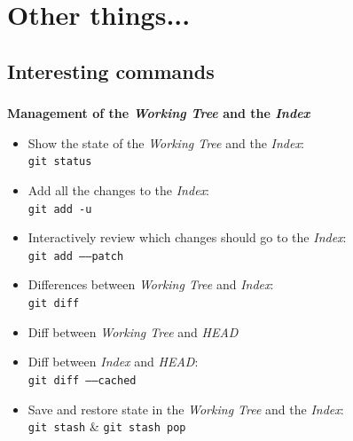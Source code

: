 
\section{Other things...}

\subsection{Interesting commands}

\begin{frame}
  \frametitle{\insertsubsection}

  \textbf{Management of the \textit{Working Tree} and the \textit{Index}}
  \begin{itemize}
  \item Show the state of the \textit{Working Tree} and the \textit{Index}:\\
    \texttt{git status}
    \vspacing

  \item Add all the changes to the \textit{Index}:\\
    \texttt{git add -u}
    \vspacing

  \item Interactively review which changes
    should go to the \textit{Index}:\\
    \texttt{git add \---\---patch} \vspacing

  \item Differences between \textit{Working Tree} and
    \textit{Index}:\\
    \texttt{git diff}
    \vspacing
  \item Diff between \textit{Working Tree} and \textit{HEAD} \vspacing
  \item Diff between \textit{Index} and \textit{HEAD}:\\
    \texttt{git diff \---\---cached}
    \vspacing

  \item Save and restore state in the \textit{Working Tree} and the
    \textit{Index}:\\
    \texttt{git stash} \& \texttt{git stash pop}
    \vspacing
  \end{itemize}
\end{frame}

